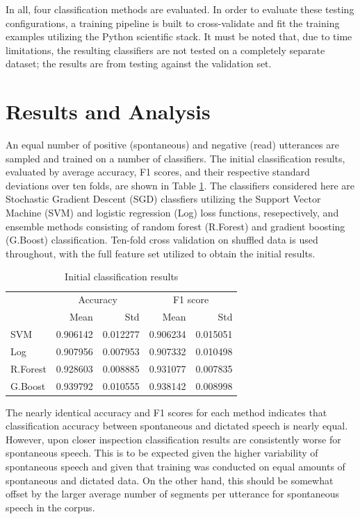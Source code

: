 \documentclass[conference]{IEEEtran}
\begin{document}
In all, four classification methods are evaluated.
In order to evaluate these testing configurations, a training pipeline is built to cross-validate and fit the training examples utilizing the Python scientific stack.
It must be noted that, due to time limitations, the resulting classifiers are not tested on a completely separate dataset; the results are from testing against the validation set. 

\section{Results and Analysis}

An equal number of positive (spontaneous) and negative (read) utterances are sampled and trained on a number of classifiers.
The initial classification results, evaluated by average accuracy, F1 scores, and their respective standard deviations over ten folds, are shown in Table \ref{init_results}.
The classifiers considered here are Stochastic Gradient Descent (SGD) classfiers utilizing the Support Vector Machine (SVM) and logistic regression (Log) loss functions, resepectively, and ensemble methods consisting of random forest (R.Forest) and gradient boosting (G.Boost) classification.
Ten-fold cross validation on shuffled data is used throughout, with the full feature set utilized to obtain the initial results.

\begin{table}[!htb]
\renewcommand{\arraystretch}{1.3}
    \caption{Initial classification results}
\label{init_results}
\centering
\begin{tabular}{l|rr|rr}
    {} & \multicolumn{2}{|c|}{Accuracy} &
    \multicolumn{2}{|c}{F1 score} \\
    {} & Mean & Std & Mean & Std \\
    \hline
    SVM &  0.906142 &  0.012277 &  0.906234 &  0.015051 \\
    Log &  0.907956 &  0.007953 &  0.907332 &  0.010498 \\
    R.Forest &  0.928603 &  0.008885 &  0.931077 &  0.007835 \\
    G.Boost &  0.939792 &  0.010555 &  0.938142 &  0.008998 \\
\end{tabular}
\end{table}

The nearly identical accuracy and F1 scores for each method indicates that classification accuracy between spontaneous and dictated speech is nearly equal.
However, upon closer inspection classification results are consistently worse for spontaneous speech.
This is to be expected given the higher variability of spontaneous speech and given that training was conducted on equal amounts of spontaneous and dictated data.
On the other hand, this should be somewhat offset by the larger average number of segments per utterance for spontaneous speech in the corpus.
\end{document}
